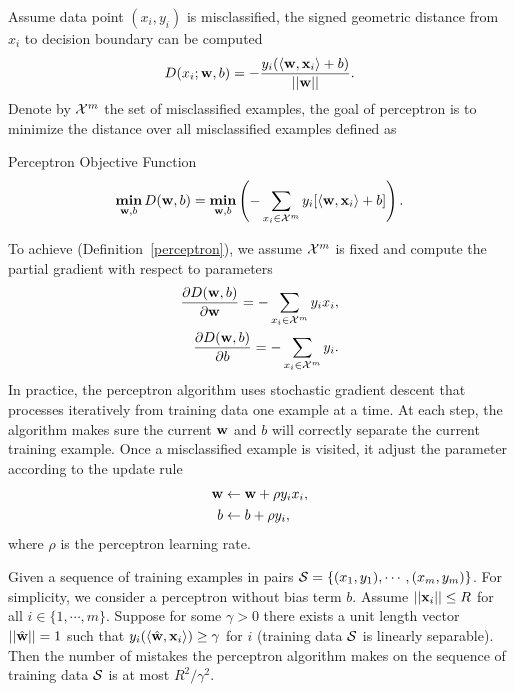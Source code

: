 Assume data point $(x_i,y_i)$ is misclassified, the signed geometric distance from $x_i$ to decision boundary can be computed 
\begin{align*}
	D(x_i;\mathbf {w},b) = -\frac{y_i(\langle \mathbf {w}, \mathbf {x}_i \rangle+b)}{\left|\left| \mathbf {w} \right|\right|}.
\end{align*}
Denote by $\mathcal{X}^m$ the set of misclassified examples, the goal of perceptron is to minimize the distance over all misclassified examples defined as
\begin{definition}{Perceptron Objective Function}\label{perceptron}
	\begin{align*}
		\underset{\mathbf {w},b}{\textbf{min}} \, D(\mathbf {w},b) = \underset{\mathbf {w},b}{\textbf{min}} \left( -\sum_{x_i\in\mathcal{X}^{m}}y_i[\langle \mathbf {w}, \mathbf {x}_i \rangle+b]\right).
	\end{align*}
\end{definition}
To achieve (Definition~\ref{perceptron}), we assume $\mathcal{X}^{m}$ is fixed and compute the partial gradient with respect to parameters
\begin{align*}
	\frac{\partial D(\mathbf {w},b)}{\partial\mathbf {w}} = -\sum_{x_i\in\mathcal{X}^m}{y_ix_i},\\
	\frac{\partial D(\mathbf {w},b)}{\partial b} = -\sum_{x_i\in\mathcal{X}^m}{y_i}.
\end{align*}
In practice, the perceptron algorithm uses stochastic gradient descent that processes iteratively from training data one example at a time.
At each step, the algorithm makes sure the current $\mathbf {w}$ and $b$ will correctly separate the current training example. 
Once a misclassified example is visited, it adjust the parameter according to the update rule
\begin{align*}
	\mathbf {w} &\leftarrow \mathbf {w} + \rho y_i x_i,\\
	b &\leftarrow b + \rho y_i,
\end{align*}
where $\rho$ is the perceptron learning rate.
\begin{theory}\label{perceptron_theory}
	Given a sequence of training examples in pairs $\mathcal{S}=\{(x_1,y_1),\cdots,(x_m,y_m)\}$. 
	For simplicity, we consider a perceptron without bias term $b$.
	Assume $\left|\left| \mathbf {x}_i \right|\right|\le R$ for all $i\in\{1,\cdots,m\}$.
	Suppose for some $\gamma>0$ there exists a unit length vector $\left|\left| \hat{\mathbf {w}} \right|\right|=1$ such that $y_i(\langle \hat{\mathbf {w}}, \mathbf {x}_i \rangle)\ge\gamma$ for $i$ (training data $\mathcal{S}$ is linearly separable).
	Then the number of mistakes the perceptron algorithm makes on the sequence of training data $\mathcal{S}$ is at most ${R^2}/{\gamma^2}$.
\end{theory}
